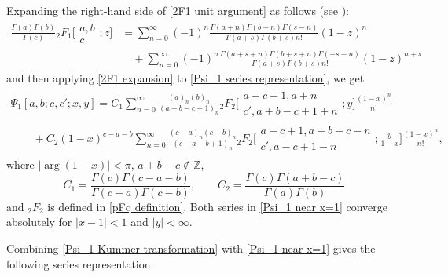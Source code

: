 \documentclass[10pt,a4paper]{amsart}
\numberwithin{equation}{section}
\newcommand{\ZZ}{\ensuremath{\mathbb{Z}}}
\begin{document}
Expanding the right-hand side of \eqref{2F1 unit argument} as follows (see \cite[equation~(1.1)]{Buhring-1992}):
\begin{align}
		\frac{\Gamma(a)\Gamma(b)}{\Gamma(c)}{}_2F_1\biggl[\begin{matrix}
			a,b \\
			c
		\end{matrix};z\biggr]&{}= \sum_{n=0}^{\infty}(-1)^n\frac{\Gamma(a+n)\Gamma(b+n)\Gamma(s-n)}{\Gamma(a+s)\Gamma(b+s)n!}(1-z)^n \nonumber\\
		&\quad{} +\sum_{n=0}^{\infty}(-1)^n\frac{\Gamma(a+s+n)\Gamma(b+s+n)\Gamma(-s-n)}{\Gamma(a+s)\Gamma(b+s)n!}(1-z)^{n+s}\label{2F1 expansion}
\end{align}
and then applying \eqref{2F1 expansion} to \eqref{Psi_1 series representation}, we get
\begin{gather}
		\Psi_1[a,b;c,c';x,y] =C_1\sum_{n=0}^{\infty}\frac{(a)_n(b)_n}{(a+b-c+1)_n}
		{}_2F_2\biggl[\begin{matrix}
			a-c+1,a+n \\
			c',a+b-c+1+n
		\end{matrix};y\biggr]\frac{ (1-x )^n}{n!}\label{Psi_1 near x=1}\\
		\qquad{} +C_2 (1-x )^{c-a-b}\sum_{n=0}^{\infty}\frac{ (c-a )_n (c-b )_n}{ (c-a-b+1 )_n}
		{}_2F_2\biggl[\begin{matrix}
			a-c+1,a+b-c-n \\
			c',a-c+1-n
		\end{matrix};\frac{y}{1-x}\biggr]\frac{ (1-x )^n}{n!},\nonumber
\end{gather}
where $|{\arg}(1-x)|<\pi$, $a+b-c\notin\ZZ$,
\[C_1=\frac{\Gamma(c)\Gamma(c-a-b)}{\Gamma(c-a)\Gamma(c-b)},\qquad C_2=\frac{\Gamma(c)\Gamma(a+b-c)}{\Gamma(a)\Gamma(b)}
\]
and $_{2}F_{2}$ is defined in \eqref{pFq definition}.
Both series in \eqref{Psi_1 near x=1} converge absolutely for $|x-1|<1$ and $|y|<\infty$.

Combining \eqref{Psi_1 Kummer transformation} with \eqref{Psi_1 near x=1} gives the following series representation.
\end{document}

